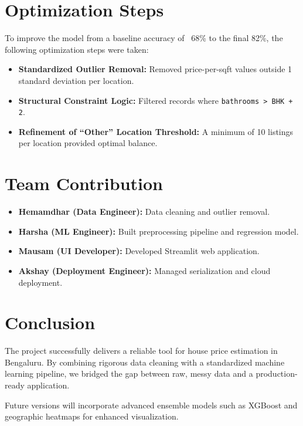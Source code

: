 \documentclass[12pt,a4paper]{article}
\begin{document}

\section{Optimization Steps}

To improve the model from a baseline accuracy of ~68\% to the final 82\%, the following optimization steps were taken:

\begin{itemize}
    \item \textbf{Standardized Outlier Removal:} Removed price-per-sqft values outside 1 standard deviation per location.
    \item \textbf{Structural Constraint Logic:} Filtered records where \texttt{bathrooms > BHK + 2}.
    \item \textbf{Refinement of ``Other'' Location Threshold:} A minimum of 10 listings per location provided optimal balance.
\end{itemize}


\section{Team Contribution}

\begin{itemize}
    \item \textbf{Hemamdhar (Data Engineer):} Data cleaning and outlier removal.
    \item \textbf{Harsha (ML Engineer):} Built preprocessing pipeline and regression model.
    \item \textbf{Mausam (UI Developer):} Developed Streamlit web application.
    \item \textbf{Akshay (Deployment Engineer):} Managed serialization and cloud deployment.
\end{itemize}


\section{Conclusion}

The project successfully delivers a reliable tool for house price estimation in Bengaluru. By combining rigorous data cleaning with a standardized machine learning pipeline, we bridged the gap between raw, messy data and a production-ready application.

Future versions will incorporate advanced ensemble models such as XGBoost and geographic heatmaps for enhanced visualization.
\end{document}
